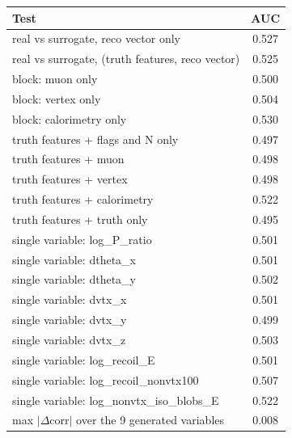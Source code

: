 \begin{tabular}{lc}
\toprule
Test & AUC \\
\midrule
real vs surrogate, reco vector only & 0.527 \\
real vs surrogate, (truth features, reco vector) & 0.525 \\
\midrule
block: muon only & 0.500 \\
block: vertex only & 0.504 \\
block: calorimetry only & 0.530 \\
truth features + flags and N only & 0.497 \\
truth features + muon & 0.498 \\
truth features + vertex & 0.498 \\
truth features + calorimetry & 0.522 \\
truth features + truth only & 0.495 \\
single variable: log\_P\_ratio & 0.501 \\
single variable: dtheta\_x & 0.501 \\
single variable: dtheta\_y & 0.502 \\
single variable: dvtx\_x & 0.501 \\
single variable: dvtx\_y & 0.499 \\
single variable: dvtx\_z & 0.503 \\
single variable: log\_recoil\_E & 0.501 \\
single variable: log\_recoil\_nonvtx100 & 0.507 \\
single variable: log\_nonvtx\_iso\_blobs\_E & 0.522 \\
\midrule
max $|\Delta$corr$|$ over the 9 generated variables & 0.008 \\
\bottomrule
\end{tabular}
